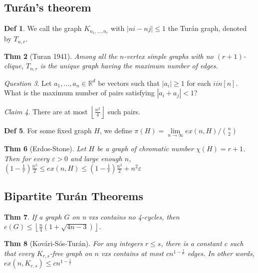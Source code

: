 \documentclass[11pt, fleqn, a4paper, landscape]{article}
\theoremstyle{plain} %
\newtheorem{thm}{Thm}
\theoremstyle{remark} %
\newtheorem{claim}[thm]{Claim}
\newtheorem{que}[thm]{Question}
\theoremstyle{definition} %
\newtheorem{defi}[thm]{Def}
\begin{document}
\begin{multicols}{5}
\subsection{Turán’s theorem}
\begin{defi}
We call the graph $K_{n_1,\dots,n_r}$ with $|ni - nj|\le 1$ the Turán graph, denoted by $T_{n,r}$.
\end{defi}

\begin{thm}[Turan 1941]
Among all the $n$-vertex simple graphs with no $(r + 1)$-clique, $T_{n,r}$ is
the unique graph having the maximum number of edges.
\end{thm} 

\begin{que}
Let $a_1, \dots , a_n \in \mathbb{R}^d$ be vectors such that $|a_i|\ge 1$ for each $i in [n]$. What is the maximum number of pairs satisfying $|a_i + a_j| < 1$?
\end{que}

\begin{claim}
There are at most $\left\lfloor \frac{n^2}{4}\right\rfloor$ such pairs.
\end{claim}

\begin{defi}
For some fixed graph $H$, we define $\pi(H) = \lim\limits_{n\to\infty} ex(n,H)/\binom{n}{2}$
\end{defi}

\begin{thm}[Erdos-Stone]
Let $H$ be a graph of chromatic number $\chi(H) = r + 1$. Then for
every $\varepsilon > 0$ and large enough $n$, $\left(1-\frac{1}{r}\right)\frac{n^2}{2}\le ex(n,H)\le\left(1-\frac{1}{r}\right)\frac{n^2}{2}+n^2\varepsilon$
\end{thm}
 \addtocounter{thm}{1}
\subsection{Bipartite Turán Theorems}

\begin{thm}
If a graph $G$ on n vxs contains no 4-cycles, then $e(G)\le\left\lfloor\frac{n}{4}(1+\sqrt{4n-3})\right\rfloor$.
\end{thm}
\addtocounter{thm}{1}
\begin{thm}[Kovári-Sós-Turán]
For any integers $r \le s$, there is a constant $c$ such that every
$K_{r,s}$-free graph on $n$ vxs contains at most $cn^{1-\frac{1}{r}}$ edges. In other words, $ex(n,K_{r,s}) \le cn^{1-\frac{1}{r}}$ 
\end{thm}


\end{multicols}
\end{document}
